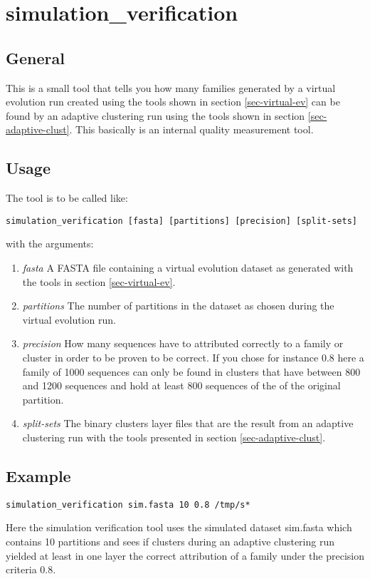 \section{simulation\_verification}

\subsection{General}

This is a small tool that tells you how many families generated by a virtual
evolution run created using the tools shown in section
\ref{sec-virtual-ev} can be found by an adaptive clustering run using
the tools shown in section \ref{sec-adaptive-clust}. This basically is
an internal quality measurement tool.

\subsection{Usage}

The tool is to be called like:

\begin{lstlisting}
simulation_verification [fasta] [partitions] [precision] [split-sets]
\end{lstlisting}
with the arguments:
\begin{enumerate}
  \item \emph{fasta} A FASTA file containing a virtual evolution
    dataset as generated with the tools in section
    \ref{sec-virtual-ev}.
  \item \emph{partitions} The number of partitions in the dataset as
    chosen during the virtual evolution run.
  \item \emph{precision} How many sequences have to attributed
    correctly to a family or cluster in order to be proven to be
    correct. If you chose for instance 0.8 here a family of 1000
    sequences can only be found in clusters that have between 800 and
    1200 sequences and hold at least 800 sequences of the of the
    original partition. 
  \item \emph{split-sets} The binary clusters layer files that are the
    result from an adaptive clustering run with the tools presented in
    section \ref{sec-adaptive-clust}.
\end{enumerate}

\subsection{Example}
\begin{lstlisting}
simulation_verification sim.fasta 10 0.8 /tmp/s*
\end{lstlisting}
Here the simulation verification tool uses the simulated dataset
sim.fasta which contains 10 partitions and sees if clusters during an
adaptive clustering run yielded at least in one layer the correct
attribution of a family under the precision criteria 0.8.

